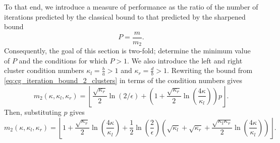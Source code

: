 To that end, we introduce a measure of performance as the ratio of the number of iterations predicted by the classical bound to that predicted by the sharpened bound
\begin{equation}
    P = \frac{m}{m_2}.
    \label{eq:performance_ratio}
\end{equation}
Consequently, the goal of this section is two-fold; determine the minimum value of $P$ and the conditions for which $P > 1$. We also introduce the left and right cluster condition numbers $\kappa_l = \frac{b}{a} > 1$ and $\kappa_r = \frac{d}{b} > 1$. Rewriting the bound from \cref{eq:cg_iteration_bound_2_clusters} in terms of the condition numbers gives
\[
    m_2(\kappa, \kappa_l, \kappa_r)=\left\lfloor\frac{\sqrt{\kappa_r}}{2} \ln (2 / \epsilon)+\left(1+\frac{\sqrt{\kappa_r}}{2} \ln \left(\frac{4\kappa}{\kappa_l}\right)\right) p\right\rfloor.
\]
Then, substituting $p$ gives
\begin{equation}
    m_2(\kappa, \kappa_l, \kappa_r)=\left\lfloor
        1 
        + \frac{\sqrt{\kappa_r}}{2}\ln\left(\frac{4\kappa}{\kappa_l}\right)
        + \frac{1}{2}\ln\left(\frac{2}{\epsilon}\right)\left(
            \sqrt{\kappa_l}
            + \sqrt{\kappa_r}
            + \frac{\sqrt{\kappa_l\kappa_r}}{2}\ln\left(\frac{4\kappa}{\kappa_l}\right)
        \right)
    \right\rfloor.
    \label{eq:cg_iteration_bound_2_clusters_condition_numbers}
\end{equation} 

